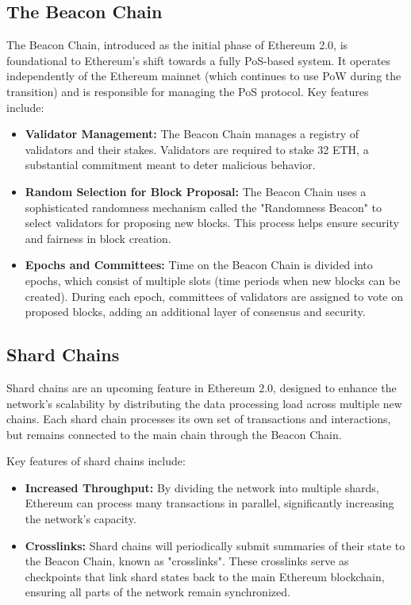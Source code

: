 \subsection{The Beacon Chain}

The Beacon Chain, introduced as the initial phase of Ethereum 2.0, is foundational to Ethereum's shift towards a fully PoS-based system. It operates independently of the Ethereum mainnet (which continues to use PoW during the transition) and is responsible for managing the PoS protocol. Key features include:

\begin{itemize}
    \item \textbf{Validator Management:} The Beacon Chain manages a registry of validators and their stakes. Validators are required to stake 32 ETH, a substantial commitment meant to deter malicious behavior.
    \item \textbf{Random Selection for Block Proposal:} The Beacon Chain uses a sophisticated randomness mechanism called the "Randomness Beacon" to select validators for proposing new blocks. This process helps ensure security and fairness in block creation.
    \item \textbf{Epochs and Committees:} Time on the Beacon Chain is divided into epochs, which consist of multiple slots (time periods when new blocks can be created). During each epoch, committees of validators are assigned to vote on proposed blocks, adding an additional layer of consensus and security.
\end{itemize}

\subsection{Shard Chains}

Shard chains are an upcoming feature in Ethereum 2.0, designed to enhance the network's scalability by distributing the data processing load across multiple new chains. Each shard chain processes its own set of transactions and interactions, but remains connected to the main chain through the Beacon Chain.

Key features of shard chains include:
\begin{itemize}
    \item \textbf{Increased Throughput:} By dividing the network into multiple shards, Ethereum can process many transactions in parallel, significantly increasing the network's capacity.
    \item \textbf{Crosslinks:} Shard chains will periodically submit summaries of their state to the Beacon Chain, known as "crosslinks". These crosslinks serve as checkpoints that link shard states back to the main Ethereum blockchain, ensuring all parts of the network remain synchronized.
\end{itemize}

